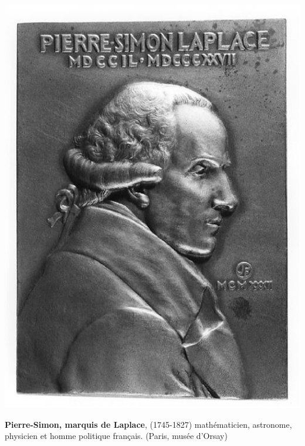 \begin{marginfigure}
    \centering
    \includegraphics[width=0.9\linewidth]{fig/Pierre-Simon-Laplace_2}
    \caption*{\textbf{Pierre-Simon, marquis 
             de Laplace}, (1745-1827) mathématicien, astronome, physicien 
             et homme politique français. (Paris, musée d'Orsay)}
\end{marginfigure}
